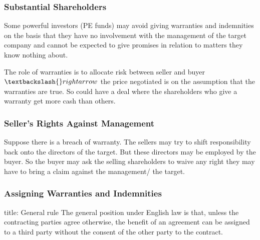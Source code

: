 \documentclass[
]{article}
\newenvironment{Shaded}{}{}
\newcommand{\NormalTok}[1]{#1}
\begin{document}
\hypertarget{substantial-shareholders}{%
\subsubsection{Substantial
Shareholders}\label{substantial-shareholders}}

Some powerful investors (PE funds) may avoid giving warranties and
indemnities on the basis that they have no involvement with the
management of the target company and cannot be expected to give promises
in relation to matters they know nothing about.

\begin{Shaded}
\begin{Highlighting}[]
\NormalTok{The role of warranties is to allocate risk between seller and buyer $\textbackslash{}rightarrow$ the price negotiated is on the assumption that the warranties are true. So could have a deal where the shareholders who give a warranty get more cash than others. }
\end{Highlighting}
\end{Shaded}

\hypertarget{sellers-rights-against-management}{%
\subsubsection{Seller's Rights Against
Management}\label{sellers-rights-against-management}}

Suppose there is a breach of warranty. The sellers may try to shift
responsibility back onto the directors of the target. But these
directors may be employed by the buyer. So the buyer may ask the selling
shareholders to waive any right they may have to bring a claim against
the management/ the target.

\hypertarget{assigning-warranties-and-indemnities}{%
\subsubsection{Assigning Warranties and
Indemnities}\label{assigning-warranties-and-indemnities}}

\begin{Shaded}
\begin{Highlighting}[]
\NormalTok{title: General rule}
\NormalTok{The general position under English law is that, unless the contracting parties agree otherwise, the benefit of an agreement can be assigned to a third party without the consent of the other party to the contract.}
\end{Highlighting}
\end{Shaded}
\end{document}

